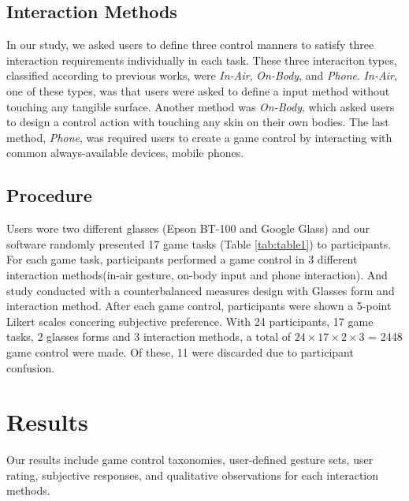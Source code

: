 \documentclass{sigchi}
\begin{document}
    \subsection {Interaction Methods}
    In our study, we asked users to define three control manners to satisfy three interaction requirements individually in each task. These three interaciton types, classified according to previous works, were \textsl{In-Air}, \textsl{On-Body}, and \textsl{Phone}. \textsl{In-Air}, one of these types, was that users were asked to define a input method without touching any tangible surface. Another method was \textsl{On-Body}, which asked users to design a control action with touching any skin on their own bodies. The last method, \textsl{Phone}, was required users to create a game control by interacting with common always-available devices, mobile phones.    


    \subsection {Procedure}
    Users wore two different glasses (Epson BT-100 and Google Glass) and our software randomly presented 17 game tasks (Table \ref{tab:table1}) to participants. For each game task, participants performed a game control in 3 different interaction methods(in-air gesture, on-body input and phone interaction). And study conducted with a counterbalanced measures design with Glasses form and interaction method. After each game control, participants were shown a 5-point Likert scales concering subjective preference. With 24 participants, 17 game tasks, 2 glasses forms and 3 interaction methods, a total of $24 \times 17 \times 2 \times 3$ = 2448 game control were made. Of these, 11 were discarded due to participant confusion. 

\section{Results}

Our results include game control taxonomies, user-defined gesture sets, user rating, subjective responses, and qualitative observations for each interaction methods.
\end{document}
